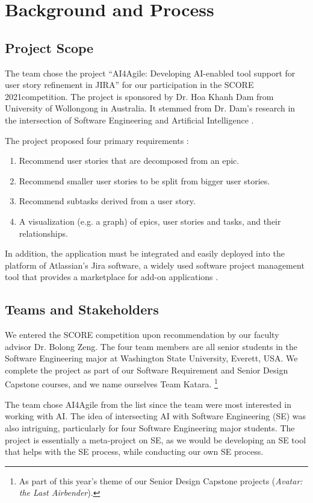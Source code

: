 \section{Background and Process}
\label{background}
\subsection{Project Scope}
\label{scope}
The team chose the project “AI4Agile: Developing AI-enabled tool support for user story refinement in JIRA” for our participation in the SCORE 2021competition. The project is sponsored by Dr. Hoa Khanh Dam from University of Wollongong in Australia. It stemmed from Dr. Dam's research in the intersection of Software Engineering and Artificial Intelligence \cite{dam1,dam2,dam3}. 

The project proposed four primary requirements \cite{proposal}:

\begin{enumerate}
	\item Recommend user stories that are decomposed from an epic.
	\item Recommend smaller user stories to be split from bigger user stories.
	\item Recommend subtasks derived from a user story.
	\item A visualization (e.g. a graph) of epics, user stories and tasks, and their relationships.
\end{enumerate}

In addition, the application must be integrated and easily deployed into the platform of Atlassian’s Jira software, a widely used software project management tool that provides a marketplace for add-on applications \cite{jira1}. 

\subsection{Teams and Stakeholders}
We entered the SCORE competition upon recommendation by our faculty advisor Dr. Bolong Zeng. The four team members are all senior students in the Software Engineering major at Washington State University, Everett, USA. We complete the project as part of our Software Requirement and Senior Design Capstone courses, and we name ourselves Team Katara. \footnote{As part of this year's theme of our Senior Design Capstone projects (\emph{Avatar: the Last Airbender}).} 

The team chose AI4Agile from the list since the team were most interested in working with AI. The idea of intersecting AI with Software Engineering (SE) was also intriguing, particularly for four Software Engineering major students. The project is essentially a meta-project on SE, as we would be developing an SE tool that helps with the SE process, while conducting our own SE process. 

